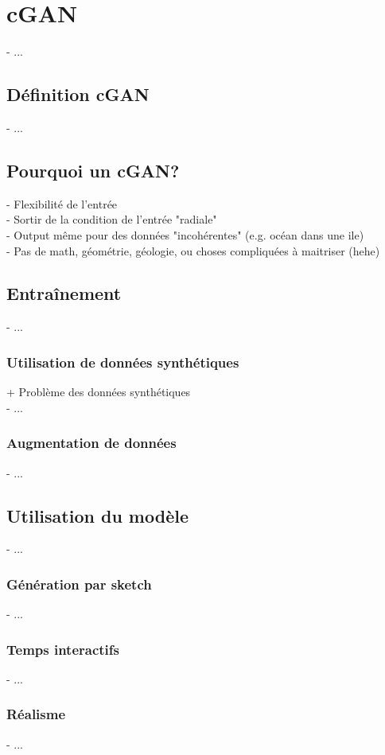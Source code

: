 \section{cGAN}
\label{sec:coral-island_cGAN}
- ...

\subsection{Définition cGAN}
- ...

\subsection{Pourquoi un cGAN?}
- Flexibilité de l'entrée \\
- Sortir de la condition de l'entrée "radiale" \\
- Output même pour des données "incohérentes" (e.g. océan dans une ile) \\
- Pas de math, géométrie, géologie, ou choses compliquées à maitriser (hehe)

\subsection{Entraînement}
- ...

\subsubsection{Utilisation de données synthétiques}
+ Problème des données synthétiques \\
- ...

\subsubsection{Augmentation de données}
- ...

\subsection{Utilisation du modèle}
- ...

\subsubsection{Génération par sketch}
- ...

\subsubsection{Temps interactifs}
- ...

\subsubsection{Réalisme}
- ...

